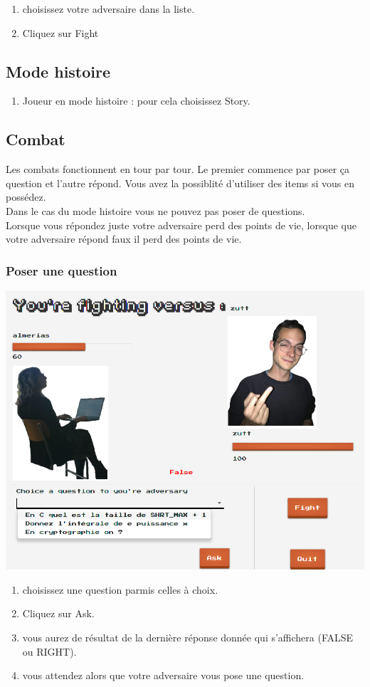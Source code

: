 \documentclass[a4paper,10pt]{report}
\begin{document}
\begin{enumerate}
 \item choisissez votre adversaire dans la liste.
 \item Cliquez sur Fight
\end{enumerate}

\subsection{Mode histoire}
\begin{enumerate}
 \item Joueur en mode histoire : pour cela choisissez Story.
\end{enumerate}

\subsection{Combat}
Les combats fonctionnent en tour par tour. Le premier commence par poser ça question et l'autre répond. Vous avez la possiblité d'utiliser des items si vous en possédez.\\
Dans le cas du mode histoire vous ne pouvez pas poser de questions.\\
Lorsque vous répondez juste votre adversaire perd des points de vie, lorsque que votre adversaire répond faux il perd des points de vie.\\

\subsubsection{Poser une question}
\includegraphics[scale=0.3]{images/poser.png}
\begin{enumerate}
 \item choisissez une question parmis celles à choix.
 \item Cliquez sur Ask.
 \item vous aurez de résultat de la dernière réponse donnée qui s'affichera (FALSE ou RIGHT).
 \item vous attendez alors que votre adversaire vous pose une question.
\end{enumerate}
\end{document}
